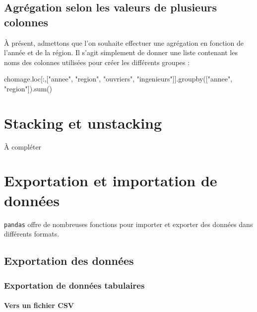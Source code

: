 \documentclass[12pt,]{book}
\newenvironment{Shaded}{\begin{snugshade}}{\end{snugshade}}
\newcommand{\StringTok}[1]{\textcolor[rgb]{0.31,0.60,0.02}{#1}}
\newcommand{\BuiltInTok}[1]{#1}
\newcommand{\NormalTok}[1]{#1}
\let\oldparagraph\paragraph
\renewcommand{\paragraph}[1]{\oldparagraph{#1}\mbox{}}
\numberwithin{equation}{section}
\numberwithin{countremarque}{section}
\begin{document}
\subsection{Agrégation selon les valeurs de plusieurs
colonnes}\label{agregation-selon-les-valeurs-de-plusieurs-colonnes}

À présent, admettons que l'on souhaite effectuer une agrégation en
fonction de l'année et de la région. Il s'agit simplement de donner une
liste contenant les noms des colonnes utilisées pour créer les
différents groupes :

\begin{Shaded}
\begin{Highlighting}[]
\NormalTok{chomage.loc[:,[}\StringTok{"annee"}\NormalTok{, }\StringTok{"region"}\NormalTok{,}
               \StringTok{"ouvriers"}\NormalTok{, }\StringTok{"ingenieurs"}\NormalTok{]].groupby([}\StringTok{"annee"}\NormalTok{,}
                                                   \StringTok{"region"}\NormalTok{]).}\BuiltInTok{sum}\NormalTok{()}
\end{Highlighting}
\end{Shaded}

\section{Stacking et unstacking}\label{stacking-et-unstacking}

À compléter

\section{Exportation et importation de
données}\label{exportation-et-importation-de-donnees}

\texttt{pandas} offre de nombreuses fonctions pour importer et exporter
des données dans différents formats.

\subsection{Exportation des données}\label{exportation-des-donnees}

\subsubsection{Exportation de données
tabulaires}\label{exportation-de-donnees-tabulaires}

\paragraph{Vers un fichier CSV}\label{vers-un-fichier-csv}
\end{document}
